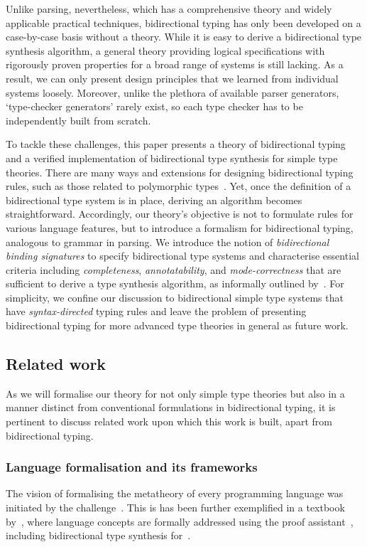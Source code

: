 Unlike parsing, nevertheless, which has a comprehensive theory and widely applicable practical techniques, bidirectional typing has only been developed on a case-by-case basis without a theory.
While it is easy to derive a bidirectional type synthesis algorithm, a general theory providing logical specifications with rigorously proven properties for a broad range of systems is still lacking.
As a result, we can only present design principles that we learned from individual systems loosely.
Moreover, unlike the plethora of available parser generators, `type-checker generators' rarely exist, so each type checker has to be independently built from scratch.

To tackle these challenges, this paper presents a theory of bidirectional typing and a verified implementation of bidirectional type synthesis for simple type theories.
There are many ways and extensions for designing bidirectional typing rules, such as those related to polymorphic types~\citep{Pierce2000,Peyton-Jones2007,Dunfield2013,Xie2018}.
Yet, once the definition of a bidirectional type system is in place, deriving an algorithm becomes straightforward.
Accordingly, our theory's objective is not to formulate rules for various language features, but to introduce a formalism for bidirectional typing, analogous to grammar in parsing.
We introduce the notion of \emph{bidirectional binding signatures} to specify bidirectional type systems and characterise essential criteria including \emph{completeness}, \emph{annotatability}, and \emph{mode-correctness} that are sufficient to derive a type synthesis algorithm, as informally outlined by~\citet{Dunfield2021}.
For simplicity, we confine our discussion to bidirectional simple type systems that have \emph{syntax-directed} typing rules and leave the problem of presenting bidirectional typing for more advanced type theories in general as future work.

\subsection{Related work}
As we will formalise our theory for not only simple type theories but also in a manner distinct from conventional formulations in bidirectional typing, it is pertinent to discuss related work upon which this work is built, apart from bidirectional typing.

\subsubsection{Language formalisation and its frameworks} \label{sec:language-formalisation}
The vision of formalising the metatheory of every programming language was initiated by the \PoplMark challenge~\citep{Aydemir2005}.
This is has been further exemplified in a textbook by~\citet{Wadler2022}, where language concepts are formally addressed using the proof assistant~\Agda, including bidirectional type synthesis for~\PCF.


